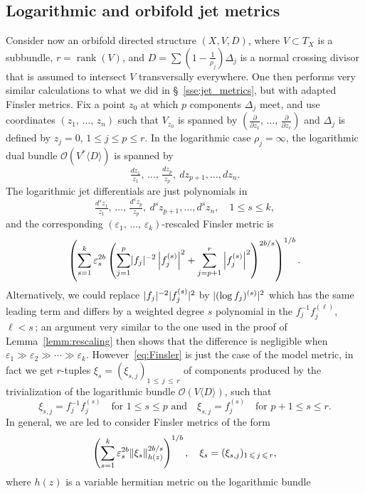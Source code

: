 \documentclass[AHL,Unicode,longabstracts,published]{cedram}
\DeclareMathOperator{\rank}{rank}
\DeclarePairedDelimiter{\abs}{\lvert}{\rvert}
\DeclarePairedDelimiter{\Abs}{\lVert}{\rVert}
\newcommand*\cO{\mathcal{O}}
\let\leq\leqslant
\begin{document}
\subsection{Logarithmic and orbifold jet metrics}\label{sse:orbi_jet_metrics}
Consider now an orbifold directed structure
$(X,V,D)$, where $V\subset T_X$ is a subbundle, $r=\rank(V)$, and
$D=\sum(1-\tfrac{1}{ \rho_j})\Delta_j$ is a normal crossing divisor that is assumed to intersect $V$ transversally everywhere. One then performs very similar calculations to what we did in \S~\ref{sse:jet_metrics}, but with adapted Finsler metrics. Fix a point $z_0$ at which $p$ components
$\Delta_j$ meet, and use coordinates $(z_1,\,\dotsc,\,z_n)$ such that
$V_{z_0}$ is spanned by $(\tfrac{\partial}{\partial z_1},\,\dotsc,\,\tfrac{\partial}{\partial z_r})$ and $\Delta_j$ is defined by
$z_j=0$, $1\leq j\leq p\leq r$. In the logarithmic case
$\rho_j=\infty$, the logarithmic dual bundle $\cO(V^*\langle D\rangle)$ is spanned by
\[
\tfrac{dz_1}{ z_1},\,\dotsc,\,\tfrac{dz_p}{ z_p},~dz_{p+1},\dotsc,dz_n.
\]
The logarithmic jet differentials are just polynomials in
\[
\tfrac{d^sz_1}{ z_1},\,\dotsc,\,\tfrac{d^sz_p}{ z_p},~d^sz_{p+1},\dotsc,d^sz_n,
\quad 1\leq s\leq k,
\]
and the corresponding $(\varepsilon_1,\,\dotsc,\,\varepsilon_k)$-rescaled Finsler metric is
\begin{equation}\label{eq:Finsler}
\left(
\sum_{s=1}^k\varepsilon_s^{2b}\left(\sum_{j=1}^p
\abs{f_j}^{-2}\left|f_j^{(s)}\right|^2+\sum_{j=p+1}^r\left|f_j^{(s)}\right|^2\right)^{2b/s}
\right)^{1/b}.
\end{equation}
Alternatively, we could replace $\abs{f_j}^{-2}\abs{f_j^{(s)}}^2$ by
$\abs{(\log f_j)^{(s)}}^2$ which has the same leading term and differs by a weighted degree $s$ polynomial in the $f_j^{-1}f_j^{(\ell)}$,
$\ell<s\,$; an argument very similar to the one used in the proof of Lemma~\ref{lemm:rescaling} then shows that the difference is negligible when $\varepsilon_1\gg \varepsilon_2\gg \cdots\gg\varepsilon_k$. However~\eqref{eq:Finsler} is just the case of the model metric, in fact we get
$r$-tuples $\xi_s=(\xi_{s,j})_{1\,\leq\,j\,\leq\,r}$ of components produced by the trivialization of the logarithmic bundle
$\cO(V\langle D\rangle)$, such that
\[
\xi_{s,j}=f_j^{-1}f_j^{(s)}\quad\text{for $1\leq s\leq p$ and}\quad
\xi_{s,j}=f_j^{(s)}\quad\text{for $p+1\leq s\leq r$}.
\]
In general, we are led to consider Finsler metrics of the form
\[
\left(\sum_{s=1}^k\varepsilon_s^{2b}\Abs{\xi_s}_{h(z)}^{2b/s}\right)^{1/b},
\quad\xi_s = (\xi_{s,j})_{1\,\leq\,j\,\leq\,r},
\]
where $h(z)$ is a variable hermitian metric on the logarithmic bundle
\end{document}
